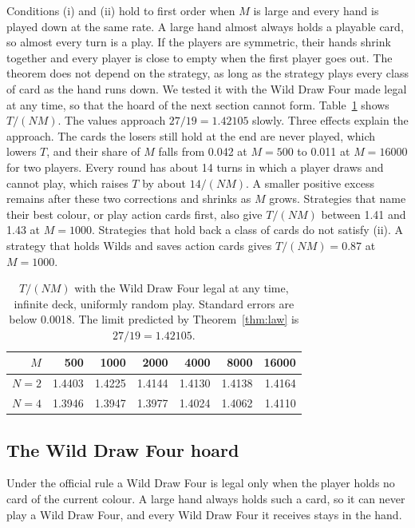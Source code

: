 \documentclass[11pt]{amsart}
\theoremstyle{remark}
\begin{document}
Conditions (i) and (ii) hold to first order when $M$ is large and every hand is played down at the same rate. A large hand almost always holds a playable card, so almost every turn is a play. If the players are symmetric, their hands shrink together and every player is close to empty when the first player goes out. The theorem does not depend on the strategy, as long as the strategy plays every class of card as the hand runs down. We tested it with the Wild Draw Four made legal at any time, so that the hoard of the next section cannot form. Table~\ref{tab:free} shows $T/(NM)$. The values approach $27/19=1.42105$ slowly. Three effects explain the approach. The cards the losers still hold at the end are never played, which lowers $T$, and their share of $M$ falls from 0.042 at $M=500$ to 0.011 at $M=16000$ for two players. Every round has about 14 turns in which a player draws and cannot play, which raises $T$ by about $14/(NM)$. A smaller positive excess remains after these two corrections and shrinks as $M$ grows. Strategies that name their best colour, or play action cards first, also give $T/(NM)$ between 1.41 and 1.43 at $M=1000$. Strategies that hold back a class of cards do not satisfy (ii). A strategy that holds Wilds and saves action cards gives $T/(NM)=0.87$ at $M=1000$.

\begin{table}[h]
\centering
\begin{tabular}{rrrrrrr}
\toprule
$M$ & 500 & 1000 & 2000 & 4000 & 8000 & 16000 \\
\midrule
$N=2$ & 1.4403 & 1.4225 & 1.4144 & 1.4130 & 1.4138 & 1.4164 \\
$N=4$ & 1.3946 & 1.3947 & 1.3977 & 1.4024 & 1.4062 & 1.4110 \\
\bottomrule
\end{tabular}
\caption{$T/(NM)$ with the Wild Draw Four legal at any time, infinite deck, uniformly random play. Standard errors are below 0.0018. The limit predicted by Theorem~\ref{thm:law} is $27/19=1.42105$.}
\label{tab:free}
\end{table}

\subsection{The Wild Draw Four hoard}

Under the official rule a Wild Draw Four is legal only when the player holds no card of the current colour. A large hand always holds such a card, so it can never play a Wild Draw Four, and every Wild Draw Four it receives stays in the hand.
\end{document}
